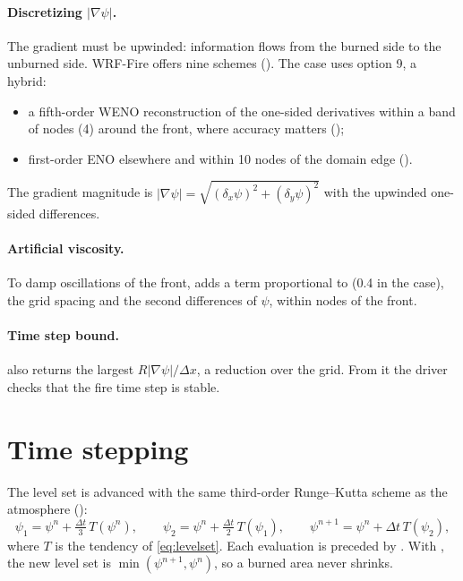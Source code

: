 \paragraph{Discretizing $|\nabla\psi|$.} The gradient must be upwinded: information flows from the burned side to the
unburned side. WRF-Fire offers nine schemes (). The case uses option 9, a hybrid:
\begin{itemize}
  \item a fifth-order WENO reconstruction of the one-sided derivatives \citep{jiang1996} within a band of
     nodes (4) around the front, where accuracy matters ();
  \item first-order ENO elsewhere and within 10 nodes of the domain edge ().
\end{itemize}
The gradient magnitude is
$|\nabla\psi| = \sqrt{(\delta_x\psi)^2 + (\delta_y\psi)^2}$ with the upwinded one-sided differences.

\paragraph{Artificial viscosity.} To damp oscillations of the front,  adds a term proportional to
 (0.4 in the case), the grid spacing and the second differences of $\psi$, within
 nodes of the front.

\paragraph{Time step bound.}  also returns the largest $R|\nabla\psi|/\Delta x$, a reduction over the
grid. From it the driver checks that the fire time step is stable.

\section{Time stepping}

The level set is advanced with the same third-order Runge--Kutta scheme as the atmosphere
():
\begin{equation}
  \psi_1 = \psi^n + \tfrac{\Delta t}{3}\,T(\psi^n), \qquad
  \psi_2 = \psi^n + \tfrac{\Delta t}{2}\,T(\psi_1), \qquad
  \psi^{n+1} = \psi^n + \Delta t\,T(\psi_2),
\end{equation}
where $T$ is the tendency of \cref{eq:levelset}. Each evaluation is preceded by . With
, the new level set is $\min(\psi^{n+1}, \psi^n)$, so a burned area never shrinks.

